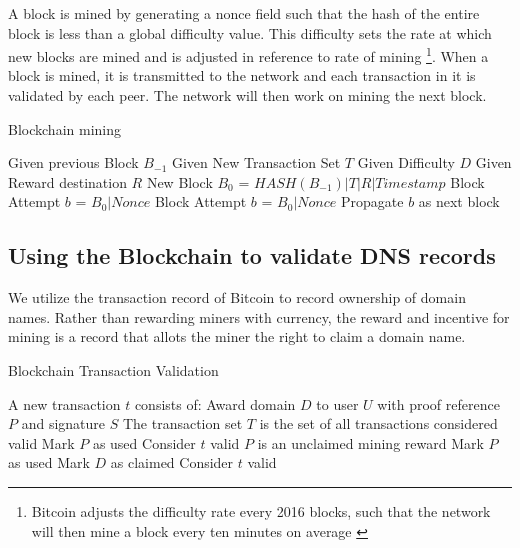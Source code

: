 A block is mined by generating a nonce field such that the hash of the entire block is less than a global difficulty value. This difficulty sets the rate at which new blocks are mined and is adjusted in reference to rate of mining \footnote{Bitcoin adjusts the difficulty rate every 2016 blocks, such that the network will then mine a block every ten minutes on average \cite{bitdiff}}.  When a block is mined, it is transmitted to the network and each transaction in it is validated by each peer. The network will then work on mining the next block.

\begin{algorithm}
	\caption{Blockchain mining}
	\label{alg:mining}
	\begin{algorithmic}[1]  %
		\State Given previous Block $B_{-1}$
		\State Given New Transaction Set $T$
		\State Given Difficulty $D$
		\State Given Reward destination $R$
		\State New Block $B_0$ = $HASH(B_{-1})|T|R|Timestamp$
		\State Block Attempt $b$ = $B_0|Nonce$
			\State Block Attempt $b$ = $B_0|Nonce$
		\EndWhile
		\State Propagate $b$ as next block
	\end{algorithmic}
\end{algorithm}


\subsection{Using the Blockchain to validate DNS records}
We utilize the transaction record of Bitcoin to record ownership of domain names. Rather than rewarding miners with currency,  the reward and incentive for mining is a record that allots the miner the right to claim a domain name.  


\begin{algorithm}
	\caption{Blockchain Transaction Validation}
	\label{alg:validation}
	\begin{algorithmic}[1]  %
		\State A new transaction $t$ consists of: Award domain $D$ to user $U$ with proof reference $P$ and signature $S$
		\State The transaction set $T$ is the set of all transactions considered valid
		\State Mark $P$ as used
		\State Consider $t$ valid
		\Else
		\State $P$ is an unclaimed mining reward
		\State Mark $P$ as used
		\State  Mark $D$ as claimed
		\State Consider $t$ valid
		\EndIf
		\EndIf
		\EndIf
		\EndIf
		\EndIf
	\end{algorithmic}
\end{algorithm}


